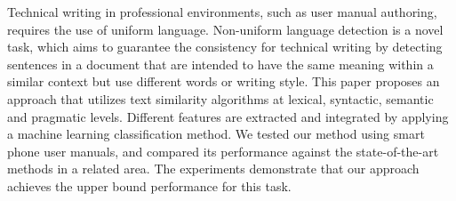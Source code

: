Technical writing in professional environments, such as user manual authoring, requires the use of uniform language. Non-uniform language detection is a novel task, which aims to guarantee the consistency for technical writing by detecting sentences in a document that are intended to have the same meaning within a similar context but use different words or writing style. This paper proposes an approach that utilizes text similarity algorithms at lexical, syntactic, semantic and pragmatic levels. Different features are extracted and integrated by applying a machine learning classification method. We tested our method using smart phone user manuals, and compared its performance against the state-of-the-art methods in a related area. The experiments demonstrate that our approach  achieves the upper bound performance for this task.
